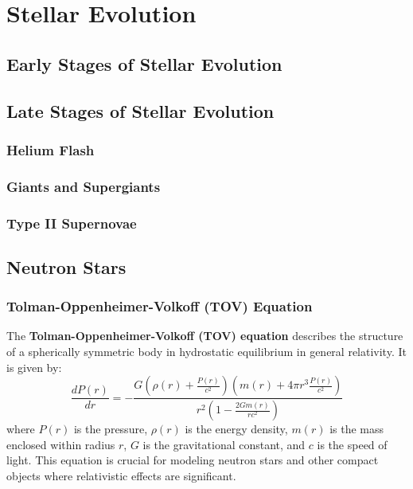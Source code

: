 \chapter{Stellar Evolution}

\section{Early Stages of Stellar Evolution}

\section{Late Stages of Stellar Evolution}

\subsection{Helium Flash}

\subsection{Giants and Supergiants}

\subsection{Type II Supernovae}

\section{Neutron Stars}

\subsection{Tolman-Oppenheimer-Volkoff (TOV) Equation}
\begin{theory}
The \textbf{Tolman-Oppenheimer-Volkoff (TOV) equation} describes the structure of a spherically symmetric body in hydrostatic equilibrium in general relativity. It is given by:
\begin{equation}
\frac{dP(r)}{dr} = -\frac{G \left(\rho(r) + \frac{P(r)}{c^2}\right) \left(m(r) + 4\pi r^3 \frac{P(r)}{c^2}\right)}{r^2 \left(1 - \frac{2Gm(r)}{rc^2}\right)}
\end{equation}
where $P(r)$ is the pressure, $\rho(r)$ is the energy density, $m(r)$ is the mass enclosed within radius $r$, $G$ is the gravitational constant, and $c$ is the speed of light. This equation is crucial for modeling neutron stars and other compact objects where relativistic effects are significant.
\end{theory}

